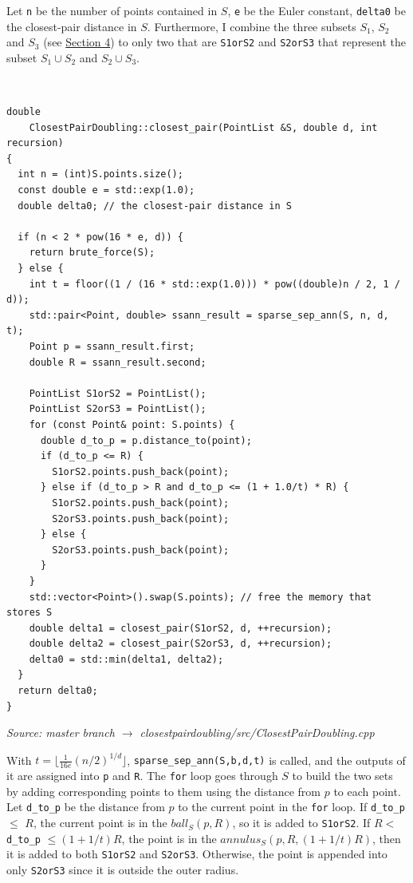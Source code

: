 \documentclass[12pt,english,]{article}
\newcommand{\code}[1]{\colorbox{lbcolor}{\texttt{#1}}}
\begin{document}
Let \code{n} be the number of points contained in \(S\), \code{e} be the
Euler constant, \code{delta0} be the closest-pair distance in \(S\).
Furthermore, I combine the three subsets \(S_1\), \(S_2\) and \(S_3\)
(see \protect\hyperlink{section4}{Section 4}) to only two that are
\code{S1orS2} and \code{S2orS3} that represent the subset
\(S_1 \cup S_2\) and \(S_2 \cup S_3\).

~

\begin{lstlisting}
double
    ClosestPairDoubling::closest_pair(PointList &S, double d, int recursion)
{
  int n = (int)S.points.size();
  const double e = std::exp(1.0);
  double delta0; // the closest-pair distance in S

  if (n < 2 * pow(16 * e, d)) {
    return brute_force(S);
  } else {
    int t = floor((1 / (16 * std::exp(1.0))) * pow((double)n / 2, 1 / d));
    std::pair<Point, double> ssann_result = sparse_sep_ann(S, n, d, t);
    Point p = ssann_result.first;
    double R = ssann_result.second;

    PointList S1orS2 = PointList();
    PointList S2orS3 = PointList();
    for (const Point& point: S.points) {
      double d_to_p = p.distance_to(point);
      if (d_to_p <= R) {
        S1orS2.points.push_back(point);
      } else if (d_to_p > R and d_to_p <= (1 + 1.0/t) * R) {
        S1orS2.points.push_back(point);
        S2orS3.points.push_back(point);
      } else {
        S2orS3.points.push_back(point);
      }
    }
    std::vector<Point>().swap(S.points); // free the memory that stores S
    double delta1 = closest_pair(S1orS2, d, ++recursion);
    double delta2 = closest_pair(S2orS3, d, ++recursion);
    delta0 = std::min(delta1, delta2);
  }
  return delta0;
}
\end{lstlisting}
\vspace{-2truemm}
\begin{minipage}{1\textwidth}
  \begin{flushright}
  {\footnotesize \emph{Source: master branch $\rightarrow$ closestpairdoubling/src/ClosestPairDoubling.cpp}\par}
  \end{flushright}
\end{minipage}
\vspace{0.5truemm}

With \(t = \lfloor \frac{1}{16e}(n/2)^{1/d}\rfloor\),
\code{sparse\_sep\_ann(S,b,d,t)} is called, and the outputs of it are
assigned into \code{p} and \code{R}. The \code{for} loop goes through
\(S\) to build the two sets by adding corresponding points to them using
the distance from \(p\) to each point. Let \code{d\_to\_p} be the
distance from \(p\) to the current point in the \code{for} loop. If
\code{d\_to\_p} \(\leq\) \(R\), the current point is in the
\(ball_S(p, R)\), so it is added to \code{S1orS2}. If \(R <\)
\code{d\_to\_p} \(\leq (1 + 1/t)R\), the point is in the
\(annulus_S(p, R, (1+1/t)R)\), then it is added to both \code{S1orS2}
and \code{S2orS3}. Otherwise, the point is appended into only
\code{S2orS3} since it is outside the outer radius.
\end{document}

